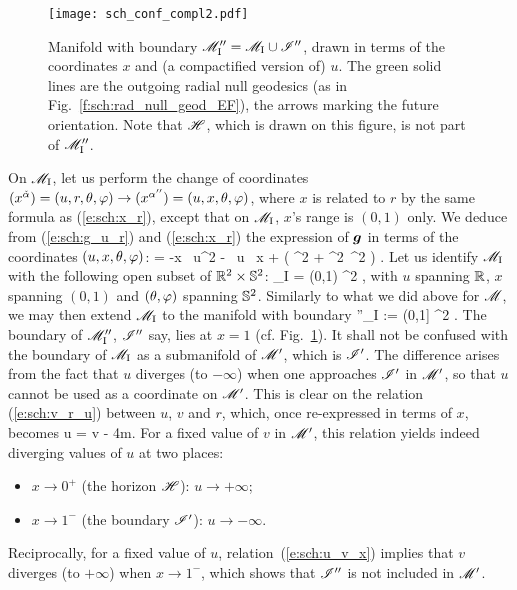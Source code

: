 \begin{figure}
\centerline{\texttt{[image: sch\_conf\_compl2.pdf]}}
\caption[]{\label{f:sch:conf_compl2} \footnotesize
Manifold with boundary
$\mathscr{M}''_{\rm I} = \mathscr{M}_{\rm I}\cup\mathscr{I}''$, drawn in terms of
the coordinates $x$ and (a compactified version of) $u$.
The green solid lines are the outgoing radial null geodesics (as in Fig.~\ref{f:sch:rad_null_geod_EF}), the arrows marking the future orientation.
Note that $\mathscr{H}$, which is drawn on this figure, is not part of $\mathscr{M}''_{\rm I}$.}
\end{figure}

On $\mathscr{M}_{\rm I}$, let us perform the change of coordinates
$(x^{\check{\alpha}}) = (u,r,\theta,\varphi) \rightarrow (x^{\alpha''}) = (u,x,\theta,\varphi)$,
where $x$ is related to $r$ by the same formula as (\ref{e:sch:x_r}),
except that on $\mathscr{M}_{\rm I}$, $x$'s range is $(0,1)$ only.
We deduce from (\ref{e:sch:g_u_r}) and (\ref{e:sch:x_r})
the expression of $\bm{g}$ in terms of the coordinates $(u,x,\theta,\varphi)$:
\be
         = -x \, \dd u^2
            - \, \dd u \, \dd x
        +   \left( \dd\th^2 + \sin^2\th\, \dd\ph^2 \right) .
\ee
Let us identify $\mathscr{M}_{\rm I}$ with the following open subset of
$\mathbb{R}^2\times \mathbb{S}^2$:
\be
    \M_{\rm I} = \R \times (0,1) \times \SS^2 ,
\ee
with $u$ spanning $\mathbb{R}$, $x$ spanning $(0,1)$ and $(\theta,\varphi)$
spanning $\mathbb{S}^2$. Similarly to what we did above for $\mathscr{M}$, we may then
extend $\mathscr{M}_{\rm I}$ to the manifold with boundary
\be
    \M''_{\rm I} :=  \R \times (0,1] \times \SS^2 .
\ee
The boundary of $\mathscr{M}''_{\rm I}$, $\mathscr{I}''$ say, lies at $x=1$
(cf. Fig.~\ref{f:sch:conf_compl2}). It shall not be
confused with the boundary of $\mathscr{M}_{\rm I}$ as a submanifold of $\mathscr{M}'$, which is
$\mathscr{I}'$. The difference arises from the fact that $u$ diverges (to $-\infty$)
when one approaches $\mathscr{I}'$ in $\mathscr{M}'$, so that $u$ cannot be used as a
coordinate on $\mathscr{M}'$. This is clear on the relation (\ref{e:sch:v_r_u})
between $u$, $v$ and $r$, which, once re-expressed in terms of $x$, becomes
\be \label{e:sch:u_v_x}
    u = v - 4m.
\ee
For a fixed value of $v$ in $\mathscr{M}'$, this relation yields indeed diverging values of
$u$ at two places:
\begin{itemize}
\item $x\rightarrow 0^+$ (the horizon $\mathscr{H}$): $u\rightarrow +\infty$;
\item $x\rightarrow 1^-$ (the boundary $\mathscr{I}'$): $u\rightarrow -\infty$.
\end{itemize}
Reciprocally, for a fixed value of $u$, relation~(\ref{e:sch:u_v_x})
implies that $v$ diverges (to $+\infty$) when $x\rightarrow 1^-$, which shows that
$\mathscr{I}''$ is not included in $\mathscr{M}'$.

